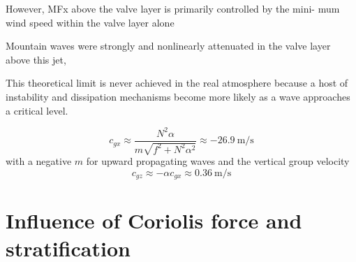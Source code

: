 However, MFx
above the valve layer is primarily controlled by the mini-
mum wind speed within the valve layer alone 


Mountain waves were strongly and nonlinearly attenuated in the valve layer above this jet,

This theoretical limit is never achieved in the real atmosphere because a host of instability and dissipation mechanisms become more likely as a wave approaches a critical level. \cite[]{fritts_gravity_2003}



\begin{equation}
    c_{gx} \approx \frac{N^2 \alpha}{m \sqrt{f^2+N^2 \alpha^2}} \approx \SI{-26.9}{\meter\per\second} 
\end{equation}
with a negative $m$ for upward propagating waves and the vertical group velocity
\begin{equation}
    c_{gz} \approx -\alpha c_{gx} \approx \SI{0.36}{\meter\per\second}
\end{equation}


\section{Influence of Coriolis force and stratification}



